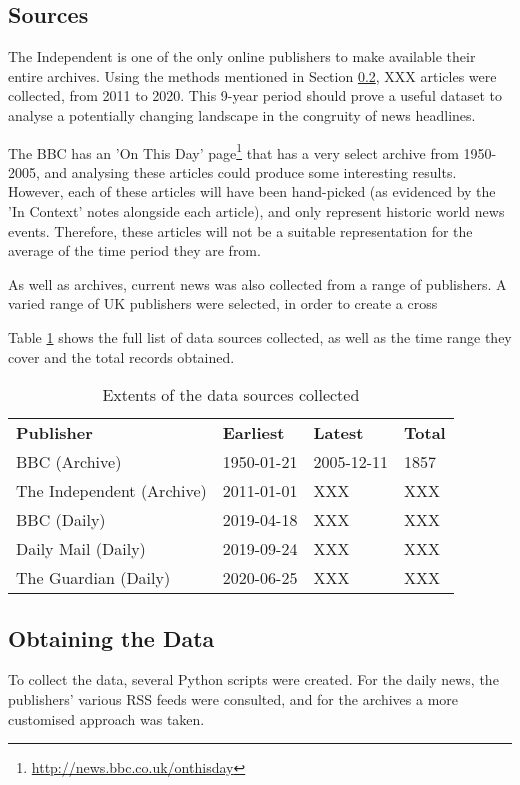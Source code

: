 \documentclass[12pt,a4paper]{article}
\begin{document}
\subsection{Sources}
The Independent is one of the only online publishers to make available their entire archives. Using the methods mentioned in Section \ref{obtaining-data}, XXX articles were collected, from 2011 to 2020. This 9-year period should prove a useful dataset to analyse a potentially changing landscape in the congruity of news headlines.

The BBC has an 'On This Day' page\footnote{\url{http://news.bbc.co.uk/onthisday}} that has a very select archive from 1950-2005, and analysing these articles could produce some interesting results. However, each of these articles will have been hand-picked (as evidenced by the 'In Context' notes alongside each article), and only represent historic world news events. Therefore, these articles will not be a suitable representation for the average of the time period they are from.

As well as archives, current news was also collected from a range of publishers. A varied range of UK publishers were selected, in order to create a cross

Table \ref{tab:data-sources} shows the full list of data sources collected, as well as the time range they cover and the total records obtained.

\begin{table}[h]
\begin{tabular}{llll}
\textbf{Publisher} & \textbf{Earliest} & \textbf{Latest} & \textbf{Total} \\
BBC (Archive) & 1950-01-21 & 2005-12-11 & 1857 \\
The Independent (Archive) & 2011-01-01 & XXX & XXX \\
BBC (Daily) & 2019-04-18 & XXX & XXX \\
Daily Mail (Daily) & 2019-09-24 & XXX & XXX \\
The Guardian (Daily) & 2020-06-25 & XXX & XXX \\
\end{tabular}
\caption{Extents of the data sources collected}
\label{tab:data-sources}
\end{table}

\subsection{Obtaining the Data} \label{obtaining-data}
To collect the data, several Python scripts were created. For the daily news, the publishers' various RSS feeds were consulted, and for the archives a more customised approach was taken.
\end{document}
